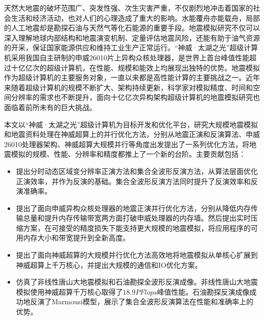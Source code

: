 \begin{cabstract}
天然大地震的破坏范围广、突发性强、次生灾害严重，不仅剧烈地冲击着国家的社会生活和经济活动，也对人们的心理造成了重大的影响。水能覆舟亦能载舟，局部的人工地震却是勘探石油与天然气等化石能源的重要手段。地震模拟研究不仅可以深入理解地球内部结构和地震演变机制、定量评估地震风险，还能有助于油气资源的开采，保证国家能源供应和维持工业生产正常运行。“神威·太湖之光”超级计算机采用我国自主研制的申威26010片上异构众核处理器，是世界上首台峰值性能超过十亿亿次的超级计算机，在性能、规模和能效上均展现出独特的优势。地震模拟作为超级计算机的主要服务对象，一直以来都是高性能计算的主要挑战之一。近年来随着超级计算机的规模不断扩大、架构持续更新，科学家对模拟精度、时间和空间分辨率的需求也不断提升，面向十亿亿次异构架构超级计算机的地震模拟研究也面临着前所未有的巨大挑战。


本文以“神威·太湖之光”超级计算机为目标开发和优化平台，研究大规模地震模拟和地震资料处理在神威超算上的并行优化方法，分别从地震正演和反演算法、申威26010处理器架构、神威超算大规模并行等角度出发提出了一系列优化方法，将地震模拟的规模、性能、分辨率和精度都推上了一个新的台阶。主要贡献包括：
  \begin{itemize}
    \item 提出分时动态区域变分辨率正演方法和集合全波形反演方法，从算法层面优化正演效率，并作为反演的基础。集合全波形反演方法同时提升了反演效率和反演准确率。
    
    \item 提出了面向申威异构众核处理器的地震正演并行优化方法，分别从降低内存传输总量和提升内存传输带宽两方面打破申威处理器的内存墙。然后提出实时压缩方案，在可接受的精度损失下能支持更大规模的地震模拟，将应用程序的可用内存大小和带宽提升到全新高度。
    
    \item 提出了面向神威超算的大规模并行优化方法高效地将地震模拟从单核心扩展到神威超算上千万核心，并提出大规模的通信和IO优化方案。

    \item 仿真了非线性唐山大地震模拟和石油勘探全波形反演成像。非线性唐山大地震模拟使用神威超算千万核心取得了$18.9PFlops$峰值性能。石油勘探反演成像成功地反演了Marmousi模型，展示了集合全波形反演算法在性能和准确率上的优势。
  \end{itemize}

\end{cabstract}


